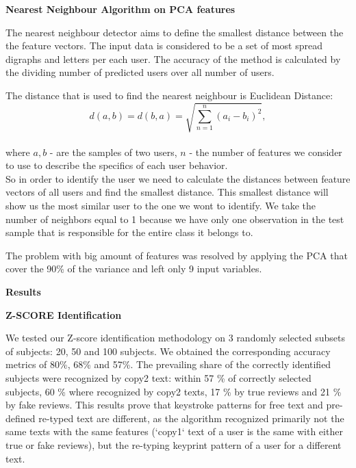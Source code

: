 \documentclass[12pt,a4]{article}
\begin{document}
\bigskip
\small\textbf{Nearest Neighbour Algorithm on PCA features}
\bigskip

\normalsize

The nearest neighbour detector aims to define the smallest distance between the the feature vectors. The input data is considered to be a set of most spread digraphs and letters per each user.  The accuracy of the method is calculated by the dividing number of predicted users over all number of users.

The distance that is used to find the nearest neighbour is Euclidean Distance:\\


$$
d(a,b) = d(b,a) = \sqrt{\sum_{n=1}^{n} (a_i - b_i)^2},
$$\\

where $a, b$ - are the samples of two users, $n$ - the number of features we consider to use to describe the specifics of each  user behavior.\\

So in order to identify the user we need to calculate the distances between feature vectors of all users and find the smallest distance. This smallest distance will show us the most similar user to the one we wont to identify. We take the number of neighbors equal to 1 because we have only one observation in the test sample that is responsible for the entire class it belongs to.

The problem with big amount of features was resolved by applying the PCA that cover the 90\% of the variance and left only 9 input variables.


\newpage
\bigskip
\large\textbf{Results}
\bigskip

\medskip
\small\textbf{Z-SCORE Identification}
\medskip

\normalsize

We tested our Z-score identification methodology on 3 randomly selected subsets of subjects: 20, 50 and 100 subjects. We obtained the corresponding accuracy metrics of 80\%, 68\% and 57\%. The prevailing share of the correctly identified subjects were recognized by copy2 text: within 57 \% of correctly selected subjects, 60 \% where recognized by copy2 texts, 17 \% by true reviews and 21 \% by fake reviews. This results prove that keystroke patterns for free text and pre-defined re-typed text are different, as the algorithm recognized primarily not the same texts with the same features (`copy1` text of a user is the same with either true or fake reviews), but the re-typing keyprint pattern of a user for a different text.
\end{document}
